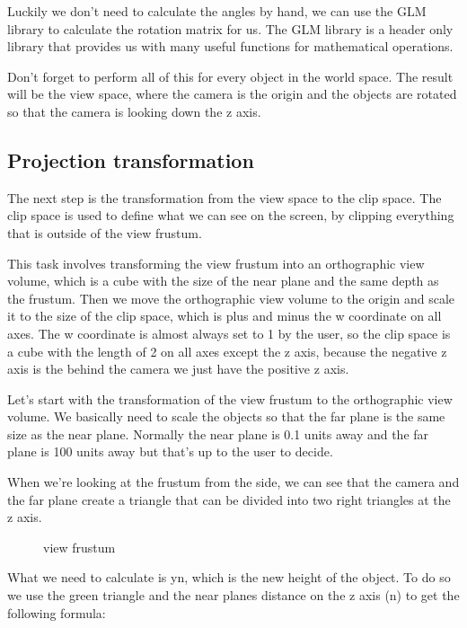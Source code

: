 \documentclass[12pt]{report} \usepackage{preamble}
\begin{document}
Luckily we don't need to calculate the angles by hand, we can use the
\ac{GLM} library to calculate the rotation matrix for us. The \ac{GLM} library is a
header only library that provides us with many useful functions for
mathematical operations.

Don't forget to perform all of this for every object in the world space.
The result will be the view space, where the camera is the origin and
the objects are rotated so that the camera is looking down the z axis.

\subsection{Projection transformation}

The next step is the transformation from the view space to the clip
space. The clip space is used to define what we can see
on the screen, by clipping everything that is outside of the view frustum.

This task involves transforming the view frustum into an orthographic view
volume, which is a cube with the size of the near plane and the same depth
as the frustum. Then we move the orthographic view volume to the origin
and scale it to the size of the clip space, which is plus and minus the
w coordinate on all axes. The w coordinate is almost always set to 1 by the user,
so the clip space is a cube with the length of 2 on all axes except the z axis,
because the negative z axis is the behind the camera we just have the positive
z axis.

Let's start with the transformation of the view frustum to the orthographic
view volume. We basically need to scale the objects so that the far plane is
the same size as the near plane. Normally the near plane is 0.1 units away and the far
plane is 100 units away but that's up to the user to decide.

When we're looking at the frustum from the side, we can see that the camera and
the far plane create a triangle that can be divided into two right triangles at the
z axis.

\begin{figure}[hbtp]
	\centering 
	\caption{view frustum}
\end{figure} \floatbarrier

What we need to calculate is yn, which is the new height of the object.
To do so we use the green triangle and the near planes distance on the z axis
(n) to get the following formula:
\end{document}
